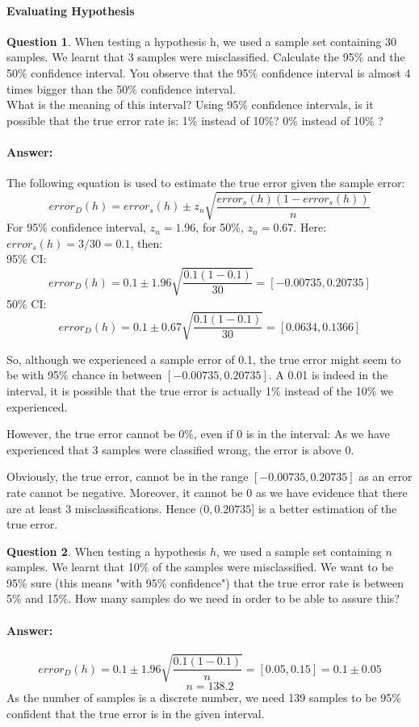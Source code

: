 \documentclass[11pt,a4paper]{article}
\theoremstyle{definition}%
\newtheorem{Q}{Question}[] %
\newcommand{\reponse}[1]{%
\ifthenelse {\boolean{corrige}} {\paragraph{Answer:} \color{darkblue}   #1\color{black}} {}
}
\begin{document}
\paragraph{Evaluating Hypothesis}
\begin{Q}
    When testing a hypothesis h, we used a sample set containing 30 samples. We learnt that 3 samples
were misclassified. Calculate the 95\% and the 50\% confidence interval. You observe that the 95\%
confidence interval is almost 4 times bigger than the 50\% confidence interval. \\ What is the meaning
of this interval? Using 95\% confidence intervals, is it possible that the true error rate is: 
1\% instead of 10\%? 0\% instead of 10\% ?
\reponse{
The following equation is used to estimate the true error given the sample error:
$$error_D(h)=error_s(h) \pm z_n \sqrt{\frac{error_s(h) (1-error_s(h))}{n} }$$ 
For 95\% confidence interval, $z_n = 1.96$, for 50\%, $z_n = 0.67$.
Here: $error_s(h) = 3/30 = 0.1$, then: \\
95\% CI: $$error_D(h) = 0.1\pm 1.96 \sqrt{\frac{0.1 (1-0.1)}{30} } = [-0.00735, 0.20735] $$
50\% CI: $$error_D(h) = 0.1\pm 0.67 \sqrt{\frac{0.1 (1-0.1)}{30} } = [0.0634, 0.1366] $$

So, although we experienced a sample error of 0.1, the true error might seem to be with 95\% chance
in between $[-0.00735,0.20735]$. A 0.01 is indeed in the interval, it is possible that the true error is
actually 1\% instead of the 10\% we experienced.

However, the true error cannot be 0\%, even if 0 is in the interval: As we have experienced that 3
samples were classified wrong, the error is above 0.

Obviously, the true error, cannot be in the range $[-0.00735,0.20735]$ as an error rate cannot be
negative. Moreover, it cannot be 0 as we have evidence that there are at least 3 misclassifications.
Hence $(0,0.20735]$ is a better estimation of the true error.
}
\end{Q}

\begin{Q}
    When testing a hypothesis $h$, we used a sample set containing $n$ samples. We learnt that 10\% of
the samples were misclassified. We want to be 95\% sure (this means "with 95\% confidence") that
the true error rate is between 5\% and 15\%. How many samples do we need in order to be able to
assure this?
\reponse{
$$error_D(h) = 0.1\pm 1.96 \sqrt{\frac{0.1 (1-0.1)}{n} } = [0.05, 0.15] = 0.1 \pm 0.05 $$
$$ n = 138.2 $$ 
    As the number of samples is a discrete number, we need 139 samples to be 95\% confident that the
true error is in the given interval.

}
\end{Q}
\end{document}
